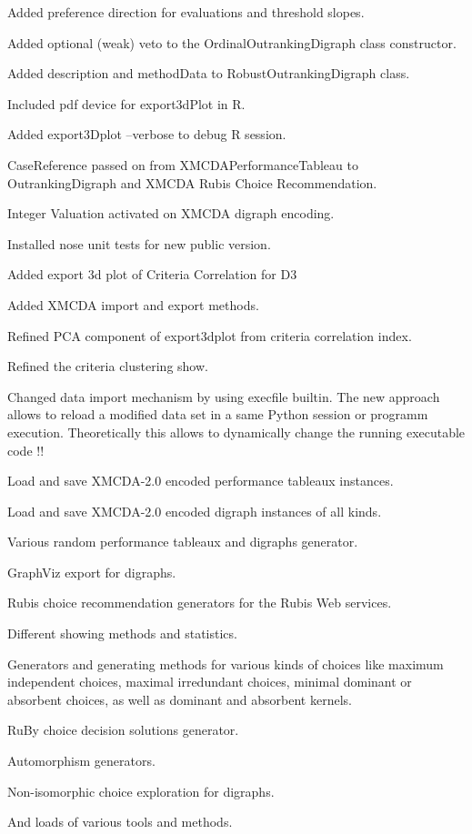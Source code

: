\documentclass{article}
\newcommand{\+}{\verb+}
\renewcommand{\*}{\back{}}
\begin{document}
\begin{center}
\begin{menu}
\item Added preference direction for evaluations and threshold slopes.
\item Added optional (weak) veto to the OrdinalOutrankingDigraph class constructor.
\item Added description and methodData to RobustOutrankingDigraph class.
\item Included pdf device for export3dPlot in R.
\item Added export3Dplot --verbose to debug R session.
\item CaseReference passed on from XMCDAPerformanceTableau to OutrankingDigraph and XMCDA Rubis Choice Recommendation.
\item Integer Valuation activated on XMCDA digraph encoding.
\item Installed nose unit tests for new public version.
\item Added export 3d plot of Criteria Correlation for D3
\item Added XMCDA import and export methods.
\item Refined PCA component of export3dplot from criteria correlation index.
\item Refined the criteria clustering show.
\item Changed data import mechanism by using execfile builtin. The new approach allows to reload a modified data set in a same Python session or programm execution. Theoretically this allows to dynamically change the running executable code !!
\item Load and save XMCDA-2.0 encoded performance tableaux instances.
\item Load and save XMCDA-2.0 encoded digraph instances of all kinds.
\item Various random performance tableaux and digraphs generator.
\item GraphViz export for digraphs.
\item Rubis choice recommendation generators for the Rubis Web services.
\item Different showing methods and statistics.
\item Generators and generating methods for various kinds of choices like maximum independent choices, maximal irredundant choices, minimal dominant or absorbent choices, as well as dominant and absorbent kernels.
\item RuBy choice decision solutions generator.
\item Automorphism generators.
\item Non-isomorphic choice exploration for digraphs.
\item And loads of various tools and methods.
\end{menu}


\end{center}
\end{document}
